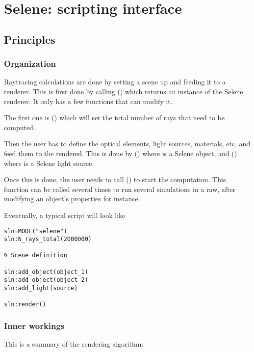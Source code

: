\chapter{Selene: scripting interface}

\section{Principles}

\subsection{Organization}

Raytracing calculations are done by setting a scene up and feeding it to a renderer. This is first done by calling () which returns an instance of the Selene renderer. It only has a few functions that can modify it.

The first one is () which will set the total number of rays that need to be computed.

Then the user has to define the optical elements, light sources, materials, etc, and feed them to the rendered. This is done by () where  is a Selene object, and () where  is a Selene light source.

Once this is done, the user needs to call () to start the computation. This function can be called several times to run several simulations in a raw, after modifying an object's properties for instance.

Eventually, a typical script will look like
\begin{lstlisting}
sln=MODE("selene")
sln:N_rays_total(2000000)

% Scene definition

sln:add_object(object_1)
sln:add_object(object_2)
sln:add_light(source)

sln:render()
\end{lstlisting}

\subsection{Inner workings}

This is a summary of the rendering algorithm:

